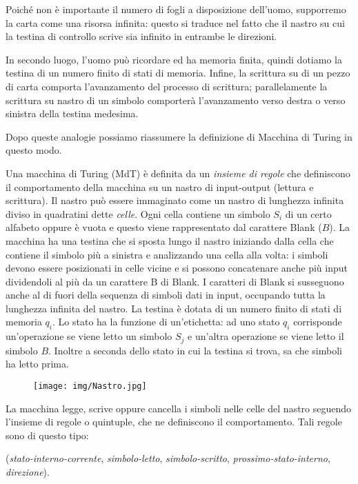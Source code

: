 Poich\'e non \`e importante il numero di fogli a disposizione dell'uomo,
supporremo la carta come una risorsa infinita: questo si traduce nel fatto che
il nastro su cui la testina di controllo scrive sia infinito in entrambe le
direzioni.

In secondo luogo, l'uomo pu\`o ricordare ed ha memoria finita, quindi dotiamo la
testina di un numero finito di stati di memoria. Infine, la scrittura su di un
pezzo di carta comporta l'avanzamento del processo di scrittura; parallelamente
la scrittura su nastro di un simbolo comporter\`a l'avanzamento verso destra o
verso sinistra della testina medesima.

Dopo queste analogie possiamo riassumere la definizione di Macchina di Turing in
questo modo.

Una macchina di Turing (MdT) \`e definita da un \textsl{insieme di
  regole} che definiscono il comportamento della macchina su un nastro
di input-output (lettura e scrittura). Il nastro pu\`o essere
immaginato come un nastro di lunghezza infinita diviso in quadratini
dette \textsl{celle}. Ogni cella contiene un simbolo $S_i$ di un certo
alfabeto oppure \`e vuota e questo viene rappresentato dal carattere
Blank ($B$). La macchina ha una testina che si sposta lungo il nastro
iniziando dalla cella che contiene il simbolo pi\`u a sinistra e
analizzando una cella alla volta: i simboli devono essere posizionati
in celle vicine e si possono concatenare anche pi\`u input dividendoli
al pi\`u da un carattere B di Blank. I caratteri di Blank si
susseguono anche al di fuori della sequenza di simboli dati in input,
occupando tutta la lunghezza infinita del nastro. La testina \`e
dotata di un numero finito di stati di memoria $q_i$. Lo stato ha la
funzione di un'etichetta: ad uno stato $q_i$ corrisponde un'operazione
se viene letto un simbolo $S_j$ e un'altra operazione se viene letto
il simbolo $B$. Inoltre a seconda dello stato in cui la testina si
trova, sa che simboli ha letto prima.

\begin{figure}[htbp!]
\centering
\texttt{[image: img/Nastro.jpg]}
\end{figure}

La macchina legge, scrive oppure cancella i simboli nelle celle del nastro
seguendo l'insieme di regole o quintuple, che ne definiscono il comportamento.
Tali regole sono di questo tipo:

\vspace{0.3cm}
(\textsl{stato-interno-corrente}, \textsl{simbolo-letto},
\textsl{simbolo-scritto}, \textsl{prossimo-stato-interno}, \textsl{direzione}).
\vspace{0.3cm}

